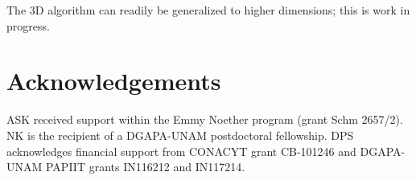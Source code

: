 \documentclass{iopart}
\begin{document}
The 3D algorithm can readily be generalized to higher dimensions; this is work in progress. 

\section{Acknowledgements}  
ASK received support within the Emmy Noether program (grant Schm
2657/2). NK is the recipient of a DGAPA-UNAM postdoctoral fellowship. DPS acknowledges financial support from CONACYT grant CB-101246 and DGAPA-UNAM PAPIIT grants IN116212 and IN117214. 




%


\end{document}
